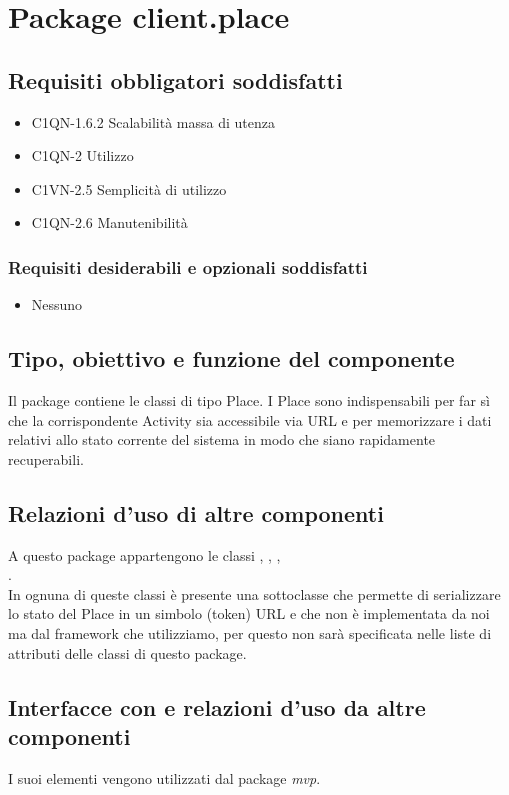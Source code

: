 \newpage
\section{Package client.place} %
\subsection*{Requisiti obbligatori soddisfatti}
\begin{itemize}
	\item C1QN-1.6.2 Scalabilit\`a massa di utenza
	\item C1QN-2 Utilizzo
	\item C1VN-2.5 Semplicit\`a di utilizzo
	\item C1QN-2.6 Manutenibilit\`a
\end{itemize}
\subsubsection*{Requisiti desiderabili e opzionali soddisfatti}
\begin{itemize}
    \item Nessuno
\end{itemize}
\subsection*{Tipo, obiettivo e funzione del componente}
Il package contiene le classi di tipo Place. I Place sono indispensabili
per far s\`i che la corrispondente Activity sia accessibile via URL e per
memorizzare i dati relativi allo stato corrente del sistema in modo che siano
rapidamente recuperabili. 
\subsection*{Relazioni d'uso di altre componenti} A
questo package appartengono le classi , ,
, \\.\\
In ognuna di queste classi \`e presente una sottoclasse  che
permette di serializzare lo stato del Place in un simbolo (token) URL e che non
\`e implementata da noi ma dal framework che utilizziamo, per questo non sar\`a
specificata nelle liste di attributi delle classi di questo package.
\subsection*{Interfacce con
e relazioni d'uso da altre componenti} I suoi elementi vengono utilizzati dal package \emph{mvp}. 
